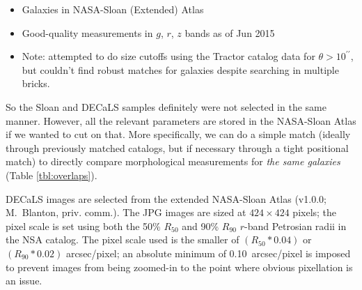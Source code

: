 \documentclass[iop,apj,tighten]{emulateapj}
\begin{document}
\begin{itemize}
    \item Galaxies in NASA-Sloan (Extended) Atlas
    \item Good-quality measurements in $g$, $r$, $z$ bands as of Jun 2015
    \item Note: attempted to do size cutoffs using the Tractor catalog data for $\theta > 10^{\prime\prime}$, but couldn't find robust matches for galaxies despite searching in multiple bricks.
\end{itemize}

So the Sloan and DECaLS samples definitely were not selected in the same manner. However, all the relevant parameters are stored in the NASA-Sloan Atlas if we wanted to cut on that. More specifically, we can do a simple match (ideally through previously matched catalogs, but if necessary through a tight positional match) to directly compare morphological measurements for \emph{the same galaxies} (Table \ref{tbl:overlaps}).

DECaLS images are selected from the extended NASA-Sloan Atlas (v1.0.0; M.~Blanton, priv. comm.). The JPG images are sized at $424\times424$ pixels; the pixel scale is set using both the 50\% $R_{50}$ and 90\% $R_{90}$ $r$-band Petrosian radii in the NSA catalog. The pixel scale used is the smaller of $(R_{50}*0.04)$ or $(R_{90}*0.02)$ arcsec/pixel; an absolute minimum of 0.10~arcsec/pixel is imposed to prevent images from being zoomed-in to the point where obvious pixellation is an issue.


\end{document}
